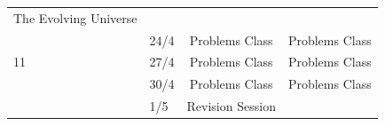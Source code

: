 \documentclass[11pt,a4paper]{book}
\begin{document}
\begin{longtable}[]{@{}llcr@{}}
\begin{minipage}[t]{0.55\columnwidth}
The Evolving Universe\strut
\end{minipage}\tabularnewline
\begin{minipage}[t]{0.05\columnwidth}\raggedright
\strut
\end{minipage} & \begin{minipage}[t]{0.09\columnwidth}\raggedright
24/4\strut
\end{minipage} & \begin{minipage}[t]{0.19\columnwidth}\centering
Problems Class\strut
\end{minipage} & \begin{minipage}[t]{0.55\columnwidth}\raggedleft
Problems Class\strut
\end{minipage}\tabularnewline
\begin{minipage}[t]{0.05\columnwidth}\raggedright
11\strut
\end{minipage} & \begin{minipage}[t]{0.09\columnwidth}\raggedright
27/4\strut
\end{minipage} & \begin{minipage}[t]{0.19\columnwidth}\centering
Problems Class\strut
\end{minipage} & \begin{minipage}[t]{0.55\columnwidth}\raggedleft
Problems Class\strut
\end{minipage}\tabularnewline
\begin{minipage}[t]{0.05\columnwidth}\raggedright
\strut
\end{minipage} & \begin{minipage}[t]{0.09\columnwidth}\raggedright
30/4\strut
\end{minipage} & \begin{minipage}[t]{0.19\columnwidth}\centering
Problems Class\strut
\end{minipage} & \begin{minipage}[t]{0.55\columnwidth}\raggedleft
Problems Class\strut
\end{minipage}\tabularnewline
\begin{minipage}[t]{0.05\columnwidth}\raggedright
\strut
\end{minipage} & \begin{minipage}[t]{0.09\columnwidth}\raggedright
1/5\strut
\end{minipage} & \begin{minipage}[t]{0.19\columnwidth}\centering
Revision Session\strut
\end{minipage} & \begin{minipage}[t]{0.55\columnwidth}\raggedleft

\end{minipage}
\end{longtable}
\end{document}

